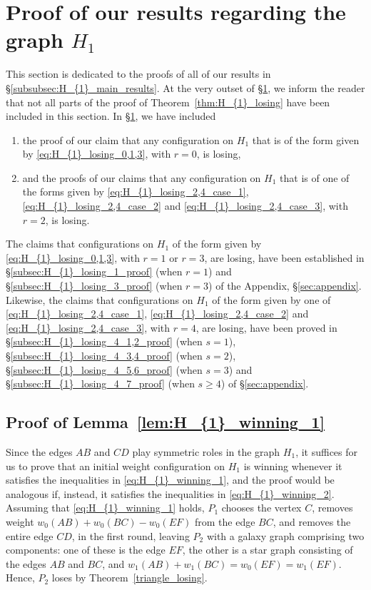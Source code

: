 \documentclass[11pt,reqno]{amsart}
\theoremstyle{definition}
\theoremstyle{definition}
\begin{document}
\section{Proof of our results regarding the graph $H_{1}$}\label{sec:proof_6_vertices}
This section is dedicated to the proofs of all of our results in \S\ref{subsubsec:H_{1}_main_results}. At the very outset of \S\ref{sec:proof_6_vertices}, we inform the reader that not all parts of the proof of Theorem~\ref{thm:H_{1}_losing} have been included in this section. In \S\ref{sec:proof_6_vertices}, we have included 
\begin{enumerate}
\item the proof of our claim that any configuration on $H_{1}$ that is of the form given by \eqref{eq:H_{1}_losing_0,1,3}, with $r=0$, is losing,
\item and the proofs of our claims that any configuration on $H_{1}$ that is of one of the forms given by \eqref{eq:H_{1}_losing_2,4_case_1}, \eqref{eq:H_{1}_losing_2,4_case_2} and \eqref{eq:H_{1}_losing_2,4_case_3}, with $r=2$, is losing.
\end{enumerate}
The claims that configurations on $H_{1}$ of the form given by \eqref{eq:H_{1}_losing_0,1,3}, with $r=1$ or $r=3$, are losing, have been established in \S\ref{subsec:H_{1}_losing_1_proof} (when $r=1$) and \S\ref{subsec:H_{1}_losing_3_proof} (when $r=3$) of the Appendix, \S\ref{sec:appendix}. Likewise, the claims that configurations on $H_{1}$ of the form given by one of \eqref{eq:H_{1}_losing_2,4_case_1}, \eqref{eq:H_{1}_losing_2,4_case_2} and \eqref{eq:H_{1}_losing_2,4_case_3}, with $r=4$, are losing, have been proved in \S\ref{subsec:H_{1}_losing_4_1,2_proof} (when $s=1$), \S\ref{subsec:H_{1}_losing_4_3,4_proof} (when $s=2$), \S\ref{subsec:H_{1}_losing_4_5,6_proof} (when $s=3$) and \S\ref{subsec:H_{1}_losing_4_7_proof} (when $s\geqslant 4$) of \S\ref{sec:appendix}.

\subsection{Proof of Lemma~\ref{lem:H_{1}_winning_1}} Since the edges $AB$ and $CD$ play symmetric roles in the graph $H_{1}$, it suffices for us to prove that an initial weight configuration on $H_{1}$ is winning whenever it satisfies the inequalities in \eqref{eq:H_{1}_winning_1}, and the proof would be analogous if, instead, it satisfies the inequalities in \eqref{eq:H_{1}_winning_2}. Assuming that \eqref{eq:H_{1}_winning_1} holds, $P_{1}$ chooses the vertex $C$, removes weight $w_{0}(AB)+w_{0}(BC)-w_{0}(EF)$ from the edge $BC$, and removes the entire edge $CD$, in the first round, leaving $P_{2}$ with a galaxy graph comprising two components: one of these is the edge $EF$, the other is a star graph consisting of the edges $AB$ and $BC$, and $w_{1}(AB)+w_{1}(BC)=w_{0}(EF)=w_{1}(EF)$. Hence, $P_{2}$ loses by Theorem~\ref{triangle_losing}.
\end{document}
